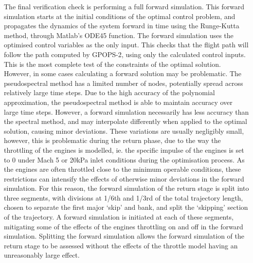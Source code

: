  The final verification check is performing a full forward simulation. This forward simulation starts at the initial conditions of the optimal control problem, and propagates the dynamics of the system forward in time using the Runge-Kutta method, through Matlab's ODE45 function. The forward simulation uses the optimised control variables as the only input. 
This checks that the flight path will follow the path computed by GPOPS-2, using only the calculated control inputs. This is the most complete test of the constraints of the optimal solution. However, in some cases calculating a forward solution may be problematic. The pseudospectral method has a limited number of nodes, potentially spread across relatively large time steps. Due to the high accuracy of the polynomial approximation, the pseudospectral method is able to maintain accuracy over large time steps\cite{Ross2004,Darby2011a}. However, a forward simulation necessarily has less accuracy than the spectral method, and may interpolate differently when applied to the optimal solution, causing minor deviations. These variations are usually negligibly small, however, this is problematic during the return phase, due to the way the throttling of the engines is modelled, ie. the specific impulse of the engines is set to 0 under Mach 5 or 20kPa inlet conditions during the optimisation process. As the engines are often throttled close to the minimum operable conditions, these restrictions can intensify the effects of otherwise minor deviations in the forward simulation.
 For this reason, the forward simulation of the return stage is split into three segments, with divisions at 1/6th and 1/3rd of the total trajectory length, chosen to separate the first major `skip' and bank, and split the `skipping' section of the trajectory. A forward simulation is initiated at each of these segments, mitigating some of the effects of the engines throttling on and off in the forward simulation. 
Splitting the forward simulation allows the forward simulation of the return stage to be assessed without the effects of the throttle model having an unreasonably large effect. 




